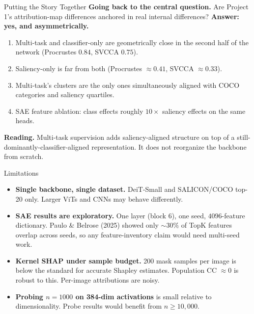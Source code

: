 \documentclass{beamer}
\begin{document}
\begin{frame}{Putting the Story Together}
\footnotesize
\textbf{Going back to the central question.} Are Project 1's attribution-map differences anchored in real internal differences?
\vfill
\textbf{Answer: yes, and asymmetrically.}
\begin{enumerate}\setlength\itemsep{1pt}
  \item Multi-task and classifier-only are geometrically close in the second half of the network (Procrustes $0.84$, SVCCA $0.75$).
  \item Saliency-only is far from both (Procrustes $\approx 0.41$, SVCCA $\approx 0.33$).
  \item Multi-task's clusters are the only ones simultaneously aligned with COCO categories and saliency quartiles.
  \item SAE feature ablation: class effects roughly $10\times$ saliency effects on the same heads.
\end{enumerate}
\vfill
\textbf{Reading.} Multi-task supervision adds saliency-aligned structure on top of a still-dominantly-classifier-aligned representation. It does not reorganize the backbone from scratch.
\end{frame}

\begin{frame}{Limitations}
\footnotesize
\begin{itemize}\setlength\itemsep{3pt}
  \item \textbf{Single backbone, single dataset.} DeiT-Small and SALICON/COCO top-20 only. Larger ViTs and CNNs may behave differently.
  \item \textbf{SAE results are exploratory.} One layer (block 6), one seed, $4096$-feature dictionary. Paulo \& Belrose (2025) showed only $\sim 30\%$ of TopK features overlap across seeds, so any feature-inventory claim would need multi-seed work.
  \item \textbf{Kernel SHAP under sample budget.} 200 mask samples per image is below the standard for accurate Shapley estimates. Population CC $\approx 0$ is robust to this. Per-image attributions are noisy.
  \item \textbf{Probing $n{=}1000$ on 384-dim activations} is small relative to dimensionality. Probe results would benefit from $n \geq 10{,}000$.
\end{itemize}
\end{frame}
\end{document}
